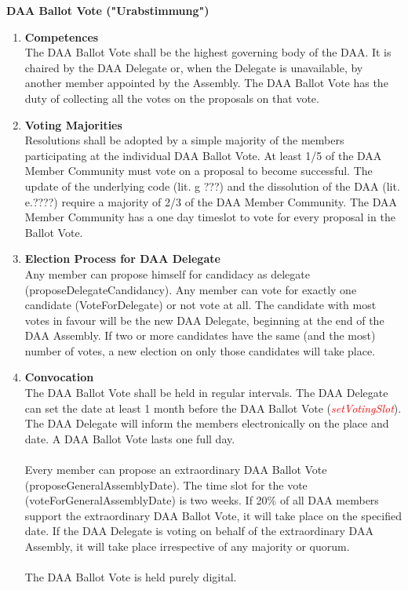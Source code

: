 \item \textbf{DAA Ballot Vote ("Urabstimmung")} \\
\begin{enumerate}[label=\textbf{\arabic*.}]
    \item \textbf{Competences} \\
    The DAA Ballot Vote shall be the highest governing body of the DAA.
    It is chaired by the DAA Delegate or, when the Delegate is unavailable, by another member appointed by the Assembly.
    The DAA Ballot Vote has the duty of collecting all the votes on the proposals on that vote.

    \item \textbf{Voting Majorities} \\
    Resolutions shall be adopted by a simple majority of the members participating at the individual DAA Ballot Vote.
    At least 1/5 of the DAA Member Community must vote on a proposal to become successful.
    The update of the underlying code (lit. g ???) and the dissolution of the DAA (lit. e.????) require a majority of 2/3 of the DAA Member Community. %
    The DAA Member Community has a one day timeslot to vote for every proposal in the Ballot Vote.

    \item \textbf{Election Process for DAA Delegate} \\
    Any member can propose himself for candidacy as delegate (proposeDelegateCandidancy).
    Any member can vote for exactly one candidate (VoteForDelegate) or not vote at all.
    The candidate with most votes in favour will be the new DAA Delegate, beginning at the end of the DAA Assembly.
    If two or more candidates have the same (and the most) number of votes, a new election on only those candidates will take place.

    \item \textbf{Convocation} \\
    The DAA Ballot Vote shall be held in regular intervals.
    The DAA Delegate can set the date at least 1 month before the DAA Ballot Vote (\textcolor{red}{\emph{setVotingSlot}}).
    The DAA Delegate will inform the members electronically on the place and date.
    A DAA Ballot Vote lasts one full day. \\ \\

    Every member can propose an extraordinary DAA Ballot Vote (proposeGeneralAssemblyDate). %
    The time slot for the vote (voteForGeneralAssemblyDate) is two weeks.
    If 20\% of all DAA members support the extraordinary DAA Ballot Vote, it will take place on the specified date.
    If the DAA Delegate is voting on behalf of the extraordinary DAA Assembly, it will take place irrespective of any majority or quorum. \\ \\
    The DAA Ballot Vote is held purely digital.


\end{enumerate}
